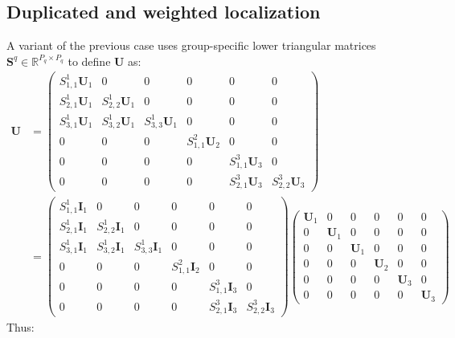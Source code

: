 \documentclass[12pt]{scrartcl}
\begin{document}
\subsection{Duplicated and weighted localization}
A variant of the previous case uses group-specific lower triangular matrices $\mathbf{S}^q \in \mathbb{R}^{P_q \times P_q}$ to define $\mathbf{U}$ as: 
\begin{align}
\mathbf{U} & = \left( \begin{array}{ccc|c|ccc}
S^1_{1,1} \mathbf{U}_1 & 0 & 0 & 0 & 0 & 0 \\
S^1_{2,1} \mathbf{U}_1 & S^1_{2,2} \mathbf{U}_1 & 0 & 0 & 0 & 0 \\
S^1_{3,1} \mathbf{U}_1 & S^1_{3,2} \mathbf{U}_1 & S^1_{3,3} \mathbf{U}_1 & 0 & 0 & 0 \\
\hline
0 & 0 & 0 & S^2_{1,1} \mathbf{U}_2 & 0 & 0 \\[0.3ex]
\hline
0 & 0 & 0 & 0 & S^3_{1,1} \mathbf{U}_3 & 0 \\
0 & 0 & 0 & 0 & S^3_{2,1} \mathbf{U}_3 & S^3_{2,2} \mathbf{U}_3
\end{array} \right) \nonumber \\
& = \left( \begin{array}{ccc|c|ccc}
S^1_{1,1} \mathbf{I}_1 & 0 & 0 & 0 & 0 & 0 \\
S^1_{2,1} \mathbf{I}_1 & S^1_{2,2} \mathbf{I}_1 & 0 & 0 & 0 & 0 \\
S^1_{3,1} \mathbf{I}_1 & S^1_{3,2} \mathbf{I}_1 & S^1_{3,3} \mathbf{I}_1 & 0 & 0 & 0 \\
\hline
0 & 0 & 0 & S^2_{1,1} \mathbf{I}_2 & 0 & 0 \\[0.3ex]
\hline
0 & 0 & 0 & 0 & S^3_{1,1} \mathbf{I}_3 & 0 \\
0 & 0 & 0 & 0 & S^3_{2,1} \mathbf{I}_3 & S^3_{2,2} \mathbf{I}_3
\end{array} \right) \left( \begin{array}{ccc|c|cc}
\mathbf{U}_1 & 0 & 0 & 0 & 0 & 0 \\
0 & \mathbf{U}_1 & 0 & 0 & 0 & 0 \\
0 & 0 & \mathbf{U}_1 & 0 & 0 & 0 \\[0.3ex]
\hline
0 & 0 & 0 & \mathbf{U}_2 & 0 & 0 \\[0.3ex]
\hline
0 & 0 & 0 & 0 & \mathbf{U}_3 & 0 \\
0 & 0 & 0 & 0 & 0 & \mathbf{U}_3
\end{array} \right)
\end{align}
Thus:
\end{document}
